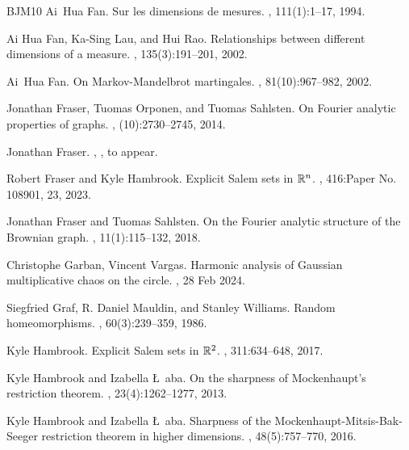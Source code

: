 \documentclass[12pt]{amsart}
\theoremstyle{definition}
\theoremstyle{remark}
\numberwithin{equation}{section}
\begin{document}
\begin{thebibliography}{BJM10}
	Ai~Hua Fan.
	\newblock Sur les dimensions de mesures.
	, 111(1):1--17, 1994.
	
	
	Ai Hua Fan, Ka-Sing Lau, and Hui Rao.
	\newblock Relationships between different dimensions of a measure.
	, 135(3):191--201, 2002.
	
	
	Ai~Hua Fan.
	\newblock On {M}arkov-{M}andelbrot martingales.
	, 81(10):967--982, 2002.
	
	Jonathan Fraser, Tuomas Orponen, and Tuomas Sahlsten.
	\newblock On {F}ourier analytic properties of graphs.
	, (10):2730--2745, 2014.
	
	Jonathan Fraser.
	,
	, to appear.
	
	Robert Fraser and Kyle Hambrook.
	\newblock Explicit {S}alem sets in {$\Bbb{R}^n$}.
	, 416:Paper No. 108901, 23, 2023.
	
	Jonathan Fraser and Tuomas Sahlsten.
	\newblock On the {F}ourier analytic structure of the {B}rownian graph.
	, 11(1):115--132, 2018.
	
	Christophe Garban, Vincent Vargas.
	\newblock Harmonic analysis of Gaussian multiplicative chaos on the circle.
	, 28 Feb 2024.
	
	Siegfried Graf, R. Daniel Mauldin, and Stanley Williams.
	\newblock Random homeomorphisms.
	, 60(3):239--359, 1986.
	
	
	
	
	
	Kyle Hambrook.
	\newblock Explicit {S}alem sets in {$\Bbb{R}^2$}.
	, 311:634--648, 2017.
	
	Kyle Hambrook and Izabella \L~aba.
	\newblock On the sharpness of {M}ockenhaupt's restriction theorem.
	, 23(4):1262--1277, 2013.
	
	Kyle Hambrook and Izabella \L~aba.
	\newblock Sharpness of the {M}ockenhaupt-{M}itsis-{B}ak-{S}eeger restriction
	theorem in higher dimensions.
	, 48(5):757--770, 2016.
	

\end{thebibliography}
\end{document}
